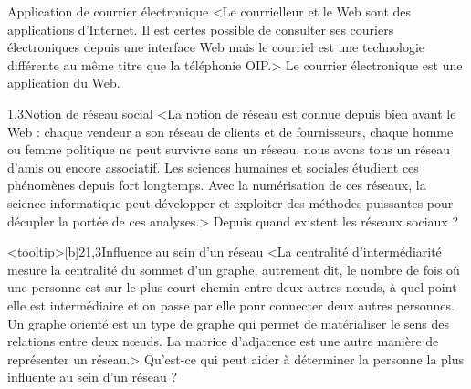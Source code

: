 \begin{quiz}[title={Web et usages}]
\vspace{-\baselineskip}
\begin{quizquestion*}[b]{2}{1}{Application de courrier électronique}
<Le courrielleur et le Web sont des applications d'Internet. Il est certes possible de consulter ses couriers électroniques depuis une interface Web mais le courriel est une technologie différente au même titre que la téléphonie OIP.>
Le courrier électronique est une application du Web.
\end{quizquestion*}

\begin{quizquestion*}[c]{2}{1,3}{Notion de réseau social}
<La notion de réseau est connue depuis bien avant le Web : chaque vendeur a son réseau de clients et de fournisseurs, chaque homme ou femme politique ne peut survivre sans un réseau, nous avons tous un réseau d'amis ou encore associatif. Les sciences humaines et sociales étudient ces phénomènes depuis fort longtemps. Avec la numérisation de ces réseaux, la science informatique peut développer et exploiter des méthodes puissantes pour décupler la portée de ces analyses.>
Depuis quand existent les réseaux sociaux ?
\end{quizquestion*}

\begin{quizquestion*}<tooltip>[b]{2}{1,3}{Influence au sein d'un réseau}
<La centralité d'intermédiarité mesure la centralité du sommet d'un graphe, autrement dit, le nombre de fois où une personne est sur le plus court chemin entre deux autres nœuds, à quel point elle est intermédiaire et on passe par elle pour connecter deux autres personnes.
Un graphe orienté est un type de graphe qui permet de matérialiser le sens des relations entre deux nœuds.
La matrice d'adjacence est une autre manière de représenter un réseau.>
Qu'est-ce qui peut aider à déterminer la personne la plus influente au sein d'un réseau ?
\end{quizquestion*}


\end{quiz}
